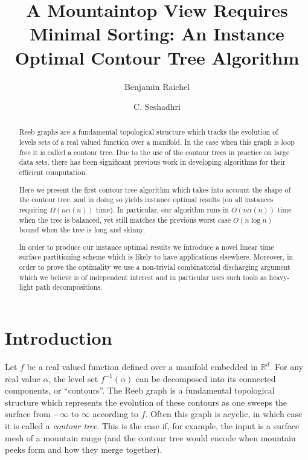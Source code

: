 \documentclass[11pt]{article}
\author{
  Benjamin Raichel
  \and
  C. Seshadhri
}
\title{A Mountaintop View Requires Minimal Sorting: \break An Instance Optimal Contour Tree Algorithm}
\date{}
\theoremstyle{definition}
\newcommand{\RR}{\mathbb{R}}
\begin{document}
\maketitle

\begin{abstract}
Reeb graphs are a fundamental topological structure which tracks the evolution of levels sets of a real valued function over a manifold.  
In the case when this graph is loop free it is called a contour tree.  Due to the use of the contour trees in practice on large data sets, 
there has been significant previous work in developing algorithms for their efficient computation. 

Here we present the first contour tree algorithm which takes into account the shape of the contour tree, 
and in doing so yields instance optimal results (on all instances requiring $\Omega(n\alpha(n))$ time).
In particular, our algorithm runs in $O(n\alpha(n))$ time when the tree is balanced, yet still 
matches the previous worst case $O(n\log n)$ bound when the tree is long and skinny.

In order to produce our instance optimal results we introduce a novel linear time surface partitioning scheme which is likely to have applications elsewhere.
Moreover, in order to prove the optimality we use a non-trivial combinatorial discharging argument which we believe is of independent interest and in particular uses 
such tools as heavy-light path decompositions.
\end{abstract}


\section{Introduction}

Let $f$ be a real valued function defined over a manifold embedded in $\RR^d$.  
For any real value $\alpha$, the level set $f^{-1}(\alpha)$ can be decomposed into its connected components, or ``contours''.
The Reeb graph is a fundamental topological structure which represents the evolution of these contours as one sweeps the surface 
from $-\infty$ to $\infty$ according to $f$.  Often this graph is acyclic, in which case it is 
called a \emph{contour tree}.  This is the case if, for example, the input is a surface mesh of a mountain range 
(and the contour tree would encode when mountain peeks form and how they merge together).
\end{document}
